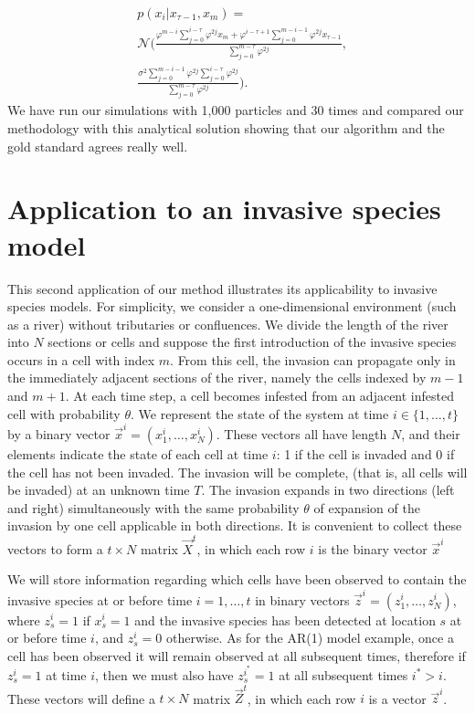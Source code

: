 \begin{align*}
      &p(x_i | x_{\tau-1}, x_{m}) = \\
      &\mathcal{N} \Bigg(\frac{\varphi^{m-i} \sum_{j=0}^{i-\tau} \varphi^{2j} x_{m} + \varphi^{i-\tau+1} \sum_{j=0}^{m-i-1} \varphi^{2j} x_{\tau-1}}{\sum_{j=0}^{m-\tau} \varphi^{2j}}, \\ &\frac{\sigma^2 \sum_{j=0}^{m-i-1} \varphi^{2j} \sum_{j=0}^{i-\tau} \varphi^{2j}}{\sum_{j=0}^{m-\tau} \varphi^{2j}} \Bigg).
\end{align*}
We have run our simulations with 1,000 particles and 30 times and compared our methodology with this analytical solution showing that our algorithm and the gold standard agrees really well.

\section{Application to an invasive species model}
\label{sec:7}

This second application of our method illustrates its applicability to invasive species models. For simplicity, we consider a one-dimensional environment (such as a river) without tributaries or confluences. We divide the length of the river into $N$ sections or cells and suppose the first introduction of the invasive species occurs in a cell with index $m$. From this cell, the invasion can propagate only in the immediately adjacent sections of the river, namely the cells indexed by $m-1$ and $m+1$. At each time step, a cell becomes infested from an adjacent infested cell with probability $\theta$. We represent the state of the system at time $i \in \{ 1, \dots, t \}$ by a binary vector $\vec{x}^{i} = (x_1^{i}, \dots, x_{N}^{i})$. These vectors all have length $N$, and their elements indicate the state of each cell at time $i$: 1 if the cell is invaded and 0 if the cell has not been invaded. The invasion will be complete, (that is, all cells will be invaded) at an unknown time $T$. 
The invasion expands in two directions (left and right) simultaneously with the same probability $\theta$ of expansion of the invasion by one cell applicable in both directions. It is convenient to collect these vectors to form a $t\times N$ matrix $\vec{X}^{t}$, in which each row $i$ is the binary vector $\vec{x}^{i}$

We will store information regarding which cells have been observed to contain the invasive species at or before time $i = 1, \dots, t$ in binary vectors $\vec{z}^{i} = (z_1^{i}, \dots, z_{N}^{i})$, where $z_s^{i} = 1$ if $x_s^{i} = 1$ and the invasive species has been detected at location $s$ at or before time $i$, and $z_s^{i} = 0$ otherwise. As for the AR(1) model example, once a cell has been observed it will remain observed at all subsequent times, therefore if $z_s^{i} = 1$ at time $i$, then we must also have $z_s^{i^{*}} = 1$ at all subsequent times $i^{*} > i$. These vectors will define a $t \times N$ matrix $\vec{Z}^{t}$, in which each row $i$ is a vector $\vec{z}^{i}$.

